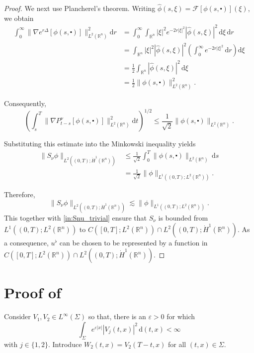 \documentclass[10pt,a4paper]{amsart}
\theoremstyle{remark}
\theoremstyle{definition}
\newcommand{\R}{\mathbb{R}}
\newcommand{\dd}{\mathrm{d}}
\begin{document}
\begin{proof}
We next use Plancherel's theorem. Writing 
$\widehat \phi(s, \xi) = \mathcal{F}[\phi(s, \centerdot)](\xi)$, we obtain
\begin{align*}
    \int_0^\infty
    \|\nabla e^{r\Delta}[\phi(s, \centerdot)]\|_{L^2(\mathbb R^n)}^2
    \dd r
    &=
    \int_0^\infty
    \int_{\mathbb R^n}
    |\xi|^2 e^{-2r|\xi|^2}
    |\widehat \phi(s, \xi)|^2
    \,\dd \xi\,\dd r
    \\
    &=
    \int_{\mathbb R^n}
    |\xi|^2 |\widehat \phi(s,\xi)|^2
    \left(
        \int_0^\infty e^{-2r|\xi|^2}\,\dd r
    \right)
    \dd \xi
    \\
    &=
    \frac12
    \int_{\mathbb R^n}
    |\widehat \phi(s,\xi)|^2\,\dd \xi
    \\
    &=
    \frac12
    \|\phi(s, \centerdot)\|_{L^2(\mathbb R^n)}^2.
\end{align*}

Consequently,
\[
    \left(
        \int_s^T
        \|\nabla P_{t-s}^\nu[\phi(s, \centerdot)]\|_{L^2(\mathbb R^n)}^2
        \dd t
    \right)^{1/2}
    \le
    \frac{1}{\sqrt{2}}
    \|\phi(s, \centerdot)\|_{L^2(\mathbb R^n)}.
\]

Substituting this estimate into the Minkowski inequality yields
\begin{align*}
    \|S_\nu\phi\|_{L^2((0,T);\dot H^1(\mathbb R^n))}
    &\le
    \frac{1}{\sqrt{2}}
    \int_0^T
    \|\phi(s, \centerdot)\|_{L^2(\mathbb R^n)}
    \,\dd s
    \\
    &=
    \frac{1}{\sqrt{2}}
    \|\phi\|_{L^1((0,T);L^2(\mathbb R^n))}.
\end{align*}

Therefore,
\[\|S_\nu \phi \|_{L^2((0, T); \dot H^1(\R^n))} \lesssim \| \phi\|_{L^1((0,T); L^2(\R^n))}.\]
This together with \eqref{in:Snu_trivial} ensure that $S_\nu$ is 
bounded from $L^1((0, T); L^2(\R^n))$ to 
$C([0, T]; L^2(\R^n))\cap L^2((0,T); \dot H^1(\R^n))$.
As a consequence, $u^\flat$ can be chosen to be represented
by a function in $C([0, T]; L^2(\R^n))\cap L^2((0,T); \dot H^1(\R^n))$.
\end{proof}

\section{Proof of \texorpdfstring{}{th:uniqueness}}
\label{sec:proof_main-th}
Consider $V_1, V_2 \in L^\infty (\Sigma) $ so that,
there is an $\varepsilon > 0$ for which
\[\int_\Sigma e^{ \varepsilon |x|} |V_j(t, x) |^2 \, \dd (t, x) < \infty\]
with $j \in \{ 1, 2 \}$. Introduce $W_2 (t, x) = V_2 (T-t, x)$ for all
$(t, x) \in \Sigma$.
\end{document}

